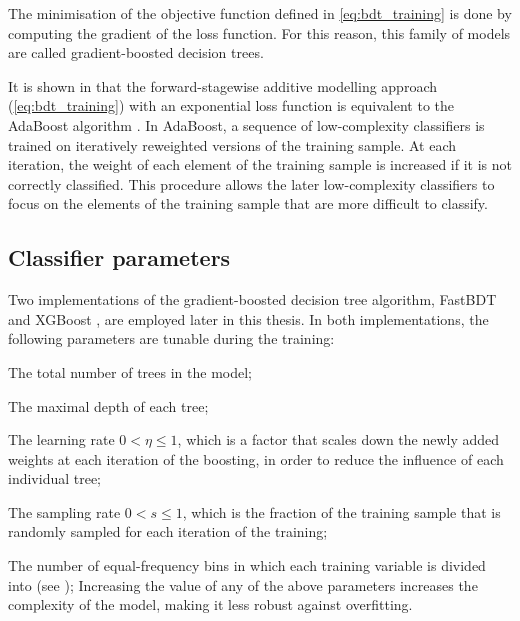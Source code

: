 The minimisation of the objective function defined in \cref{eq:bdt_training} is done by computing the gradient of the loss function.
For this reason, this family of models are called gradient-boosted decision trees.

It is shown in \cite{Friedman:2000} that the forward-stagewise additive modelling approach (\cref{eq:bdt_training}) with an exponential loss function is equivalent to the AdaBoost algorithm \cite{FREUND1997119}.
In AdaBoost, a sequence of low-complexity classifiers is trained on iteratively reweighted versions of the training sample.
At each iteration, the weight of each element of the training sample is increased if it is not correctly classified.
This procedure allows the later low-complexity classifiers to focus on the elements of the training sample that are more difficult to classify.
\subsection{Classifier parameters} \label{sec:da_cls_parameters}
Two implementations of the gradient-boosted decision tree algorithm, FastBDT \cite{Keck:2017gsv} and XGBoost \cite{Chen:2016:XST:2939672.2939785}, are employed later in this thesis.
In both implementations, the following parameters are tunable during the training:
\bi
\item The total number of trees in the model;
\item The maximal depth of each tree;
\item The learning rate $0<\eta\le1$, which is a factor that scales down the newly added weights at each iteration of the boosting, in order to reduce the influence of each individual tree;
\item The sampling rate $0<s\le1$, which is the fraction of the training sample that is randomly sampled for each iteration of the training;
\item The number of equal-frequency bins in which each training variable is divided into (see \autocite{Keck:2017gsv});
\ei
Increasing the value of any of the above parameters increases the complexity of the model, making it less robust against overfitting.
